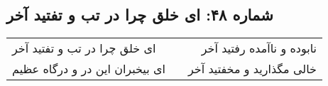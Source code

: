 \begin{center}
\section*{شماره ۴۸: ای خلق چرا در تب و تفتید آخر}
\label{sec:048}
\begin{longtable}{l p{0.5cm} r}
ای خلق چرا در تب و تفتید آخر
&&
نابوده و ناآمده رفتید آخر
\\
ای بیخبران این در و درگاه عظیم
&&
خالی مگذارید و مخفتید آخر
\\
\end{longtable}
\end{center}
